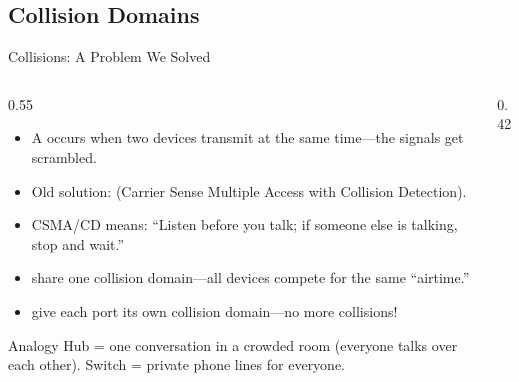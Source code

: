 \documentclass[aspectratio=169]{beamer}  %
\begin{document}
\subsection{Collision Domains}


\begin{frame}{Collisions: A Problem We Solved}
    \begin{columns}[T]
        \begin{column}{0.55\textwidth}
            \begin{itemize}
                \item A  occurs when two devices transmit at the same time---the signals get scrambled.
                \item Old solution:  (Carrier Sense Multiple Access with Collision Detection).
                \item CSMA/CD means: ``Listen before you talk; if someone else is talking, stop and wait.''
                \item {} share one collision domain---all devices compete for the same ``airtime.''
                \item {} give each port its own collision domain---no more collisions!
            \end{itemize}
            
            \vspace{0.3em}
            \begin{exampleblock}{Analogy}
                \scriptsize
                Hub = one conversation in a crowded room (everyone talks over each other). Switch = private phone lines for everyone.
            \end{exampleblock}
        \end{column}
        \begin{column}{0.42\textwidth}
            \begin{center}
\end{center}
\end{column}
\end{columns}
\end{frame}
\end{document}

